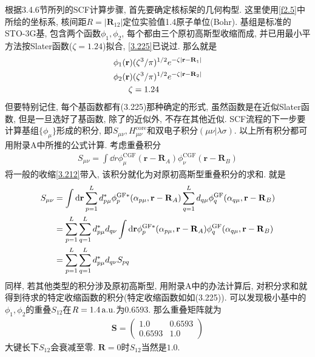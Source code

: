 根据3.4.6节所列的SCF计算步骤, 
首先要确定核标架的几何构型. 
这里使用\autoref{f2.5}中所绘的坐标系, 
核间距$R=|\mathbf{R}_{12}|$定位实验值1.4原子单位(Bohr). 
基组是标准的STO-3G基, 
包含两个函数$\phi_1,\phi_2$, 
每个都由三个原初高斯型收缩而成, 
并已用最小平方法按Slater函数($\zeta=1.24$)拟合, 
\autoref{3.225}已说过. 
那么就是
\begin{equation}
	\begin{split}
		\phi_1(\mathbf{r}) & (\zeta^3/\pi)^{1/2}e^{-\zeta|\mathbf{r-R}_1|}\\
		\phi_2(\mathbf{r}) & (\zeta^3/\pi)^{1/2}e^{-\zeta|\mathbf{r-R}_2|}\\
		\zeta & = 1.24
	\end{split}
\end{equation}
但要特别记住,
每个基函数都有(3.225)那种确定的形式, 
虽然函数是在近似Slater函数, 
但是一旦选好了基函数, 
除了\hft 的近似外, 
不存在其他近似. 
SCF流程的下一步要计算基组$\{\phi_\mu\}$形成的积分, 
即$S_{\mu\nu}, H_{\mu\nu}^\mathrm{core}$和双电子积分$(\mu\nu|\lambda\sigma)$. 
以上所有积分都可用附录A中所推的公式计算. 
考虑重叠积分
\begin{align}
	S_{\mu\nu} = \int\dd{r}\phi_\mu^\mathrm{CGF}(\mathbf{r-R}_A)\phi_\nu^\mathrm{CGF}(\mathbf{r-R}_B)
\end{align}
将一般的收缩\autoref{3.212}带入, 
该积分就化为对原初高斯型重叠积分的求和. 
就是
\begin{align}
	S_{\mu\nu} & = \int\dd{r}\sum_{p=1}^{L}d_{p\mu}^*\phi_p^\mathrm{GF*}(\alpha_{p\mu},\mathbf{r-R}_A)\sum_{q=1}^{L}d_{q\mu}\phi_q^\mathrm{GF}(\alpha_{q\mu},\mathbf{r-R}_B)\notag\\
	& = \sum_{p=1}^{L}\sum_{q=1}^{L} d_{p\mu}^*d_{q\nu}\int\dd{r}\phi_p^\mathrm{GF*}(\alpha_{p\mu},\mathbf{r-R}_A)\phi_q^\mathrm{GF}(\alpha_{q\mu},\mathbf{r-R}_B)\notag\\
	& = \sum_{p=1}^{L}\sum_{q=1}^{L}d^*_{p\mu}d_{q\nu}S_{pq}
\end{align}
同样, 
若其他类型的积分涉及原初高斯型, 
用附录A中的办法计算后, 
对积分求和就得到待求的特定收缩函数的积分(特定收缩函数如如(3.225)). 
可以发现极小基中的$\phi_1,\phi_2$的重叠$S_{12}$在$R=1.4\,\mathrm{a.u.}$为$0.6593$. 
那么重叠矩阵就为
\begin{align}
	\mathbf{S} = 
	\begin{pmatrix}
		1.0 & 0.6593\\0.6593 & 1.0
	\end{pmatrix}
\end{align}
大键长下$S_{12}$会衰减至零. 
$\mathbf{R}=0$时$S_{12}$当然是$1.0$.

